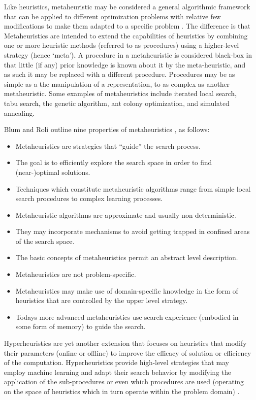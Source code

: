 \documentclass[a4paper, 11pt]{article}
\begin{document}
Like heuristics, metaheuristic may be considered a general algorithmic framework that can be applied to different optimization problems with relative few modifications to make them adapted to a specific problem \cite{Glover2003, Talbi2009}. The difference is that Metaheuristics are intended to extend the capabilities of heuristics by combining one or more heuristic methods (referred to as procedures) using a higher-level strategy (hence `meta'). A procedure in a metaheuristic is considered black-box in that little (if any) prior knowledge is known about it by the meta-heuristic, and as such it may be replaced with a different procedure. Procedures may be as simple as a the manipulation of a representation, to as complex as another metaheuristic. Some examples of metaheuristics include iterated local search, tabu search, the genetic algorithm, ant colony optimization, and simulated annealing.

Blum and Roli outline nine properties of metaheuristics \cite{Blum2003}, as follows: 
\begin{itemize}
	\item Metaheuristics are strategies that ``guide'' the search process.
	\item The goal is to efficiently explore the search space in order to find (near-)optimal solutions.
	\item Techniques which constitute metaheuristic algorithms range from simple local search procedures to complex learning processes.
	\item Metaheuristic algorithms are approximate and usually non-deterministic.
	\item They may incorporate mechanisms to avoid getting trapped in confined areas of the search space.
	\item The basic concepts of metaheuristics permit an abstract level description.
	\item Metaheuristics are not problem-specific.
	\item Metaheuristics may make use of domain-specific knowledge in the form of heuristics that are controlled by the upper level strategy.
	\item Todays more advanced metaheuristics use search experience (embodied in some form of memory) to guide the search.
\end{itemize}

Hyperheuristics are yet another extension that focuses on heuristics that modify their parameters (online or offline) to improve the efficacy of solution or efficiency of the computation. Hyperheuristics provide high-level strategies that may employ machine learning and adapt their search behavior by modifying the application of the sub-procedures or even which procedures are used (operating on the space of heuristics which in turn operate within the problem domain) \cite{Burke2003a, Burke2003}. 
\end{document}
